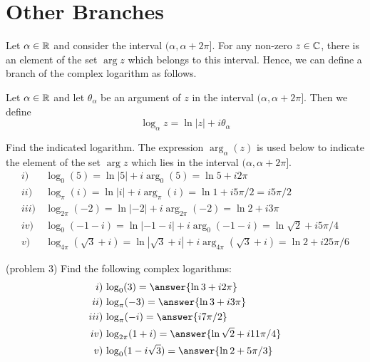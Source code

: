 \documentclass[handout]{ximera}
\begin{document}
\section{Other Branches}

Let $\alpha \in \mathbb R$ and consider the interval $(\alpha, \alpha + 2\pi]$. For any non-zero $z \in \mathbb C$, there is an element of the
set $\arg z$ which belongs to this interval. Hence, we can define a branch of the complex logarithm as follows.

\begin{definition}
Let $\alpha \in \mathbb R$ and let $\theta_\alpha$ be an argument of $z$ in the interval $(\alpha, \alpha + 2\pi]$.
Then we define
\[
\log_\alpha z = \ln|z| +i\theta_\alpha
\]
\end{definition}


\begin{example}[Example 3] 
Find the indicated logarithm. The expression $\arg_\alpha(z)$ is used below to indicate the element of the set 
$\arg z$ which lies in the interval $(\alpha, \alpha + 2\pi]$.\\
\begin{align*}
i)  \, & \log_0(5) = \ln|5|+ i \arg_0(5) = \ln 5 + i2\pi\\
ii) \,  & \log_\pi(i) = \ln|i|+ i \arg_\pi(i) = \ln 1 + i5\pi/2 = i5\pi/2\\
iii) \,  & \log_{2\pi}(-2) = \ln|-2|+ i \arg_{2\pi}(-2) = \ln 2 + i3\pi\\
iv) \,  & \log_0(-1-i)= \ln|-1-i|+ i \arg_0(-1-i) = \ln \sqrt 2 + i5\pi/4\\
v)  \, & \log_{4\pi}(\sqrt 3 + i) = \ln|\sqrt 3 + i|+ i \arg_{4\pi}(\sqrt 3+i) = \ln 2 + i25\pi/6
\end{align*}
\end{example}


\begin{problem}(problem 3) 
Find the following complex logarithms:\\
\begin{align*}
i) \, & \log_0(3) = \answer{\ln 3 + i2\pi }\\
ii)  \, & \log_\pi(-3) = \answer{\ln 3 + i3\pi}\\
iii) \,  & \log_\pi(-i) = \answer{ i7\pi/2}\\
iv)  \, & \log_{2\pi}(1+i) = \answer{\ln \sqrt 2 +i11\pi/4}\\
v)  \, & \log_0(1- i\sqrt 3) = \answer{\ln 2+ 5\pi/3}
\end{align*}
\end{problem}
\end{document}
